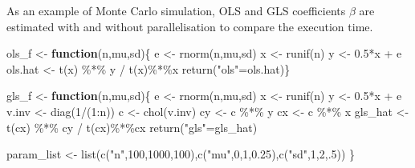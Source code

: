 \documentclass[11pt,a4paper]{article}
\newenvironment{Shaded}{\begin{snugshade}}{\end{snugshade}}
\newcommand{\ControlFlowTok}[1]{\textcolor[rgb]{0.13,0.29,0.53}{\textbf{#1}}}
\newcommand{\DecValTok}[1]{\textcolor[rgb]{0.00,0.00,0.81}{#1}}
\newcommand{\FloatTok}[1]{\textcolor[rgb]{0.00,0.00,0.81}{#1}}
\newcommand{\FunctionTok}[1]{\textcolor[rgb]{0.00,0.00,0.00}{#1}}
\newcommand{\NormalTok}[1]{#1}
\newcommand{\OtherTok}[1]{\textcolor[rgb]{0.56,0.35,0.01}{#1}}
\newcommand{\SpecialCharTok}[1]{\textcolor[rgb]{0.00,0.00,0.00}{#1}}
\newcommand{\StringTok}[1]{\textcolor[rgb]{0.31,0.60,0.02}{#1}}
\begin{document}
As an example of Monte Carlo simulation, OLS and GLS coefficients
\(\beta\) are estimated with and without parallelisation to compare the
execution time.

\begin{Shaded}
\begin{Highlighting}[]
\NormalTok{ols\_f }\OtherTok{\textless{}{-}} \ControlFlowTok{function}\NormalTok{(n,mu,sd)\{}
\NormalTok{  e }\OtherTok{\textless{}{-}} \FunctionTok{rnorm}\NormalTok{(n,mu,sd)}
\NormalTok{  x }\OtherTok{\textless{}{-}} \FunctionTok{runif}\NormalTok{(n)}
\NormalTok{  y }\OtherTok{\textless{}{-}} \FloatTok{0.5}\SpecialCharTok{*}\NormalTok{x }\SpecialCharTok{+}\NormalTok{ e}
\NormalTok{  ols.hat }\OtherTok{\textless{}{-}} \FunctionTok{t}\NormalTok{(x) }\SpecialCharTok{\%*\%}\NormalTok{ y }\SpecialCharTok{/} \FunctionTok{t}\NormalTok{(x)}\SpecialCharTok{\%*\%}\NormalTok{x}
  \FunctionTok{return}\NormalTok{(}\StringTok{"ols"}\OtherTok{=}\NormalTok{ols.hat)\}}

\NormalTok{gls\_f }\OtherTok{\textless{}{-}} \ControlFlowTok{function}\NormalTok{(n,mu,sd)\{}
\NormalTok{  e }\OtherTok{\textless{}{-}} \FunctionTok{rnorm}\NormalTok{(n,mu,sd)}
\NormalTok{  x }\OtherTok{\textless{}{-}} \FunctionTok{runif}\NormalTok{(n)}
\NormalTok{  y }\OtherTok{\textless{}{-}} \FloatTok{0.5}\SpecialCharTok{*}\NormalTok{x }\SpecialCharTok{+}\NormalTok{ e}
\NormalTok{  v.inv }\OtherTok{\textless{}{-}} \FunctionTok{diag}\NormalTok{(}\DecValTok{1}\SpecialCharTok{/}\NormalTok{(}\DecValTok{1}\SpecialCharTok{:}\NormalTok{n))}
\NormalTok{  c }\OtherTok{\textless{}{-}} \FunctionTok{chol}\NormalTok{(v.inv)}
\NormalTok{  cy }\OtherTok{\textless{}{-}}\NormalTok{ c }\SpecialCharTok{\%*\%}\NormalTok{ y}
\NormalTok{  cx }\OtherTok{\textless{}{-}}\NormalTok{ c }\SpecialCharTok{\%*\%}\NormalTok{ x}
\NormalTok{  gls\_hat }\OtherTok{\textless{}{-}} \FunctionTok{t}\NormalTok{(cx) }\SpecialCharTok{\%*\%}\NormalTok{ cy }\SpecialCharTok{/} \FunctionTok{t}\NormalTok{(cx)}\SpecialCharTok{\%*\%}\NormalTok{cx}
  \FunctionTok{return}\NormalTok{(}\StringTok{"gls"}\OtherTok{=}\NormalTok{gls\_hat)}
  
\NormalTok{  param\_list }\OtherTok{\textless{}{-}} \FunctionTok{list}\NormalTok{(}\FunctionTok{c}\NormalTok{(}\StringTok{"n"}\NormalTok{,}\DecValTok{100}\NormalTok{,}\DecValTok{1000}\NormalTok{,}\DecValTok{100}\NormalTok{),}\FunctionTok{c}\NormalTok{(}\StringTok{"mu"}\NormalTok{,}\DecValTok{0}\NormalTok{,}\DecValTok{1}\NormalTok{,}\FloatTok{0.25}\NormalTok{),}\FunctionTok{c}\NormalTok{(}\StringTok{"sd"}\NormalTok{,}\DecValTok{1}\NormalTok{,}\DecValTok{2}\NormalTok{,.}\DecValTok{5}\NormalTok{))}
\NormalTok{\}}
\end{Highlighting}
\end{Shaded}
\end{document}
